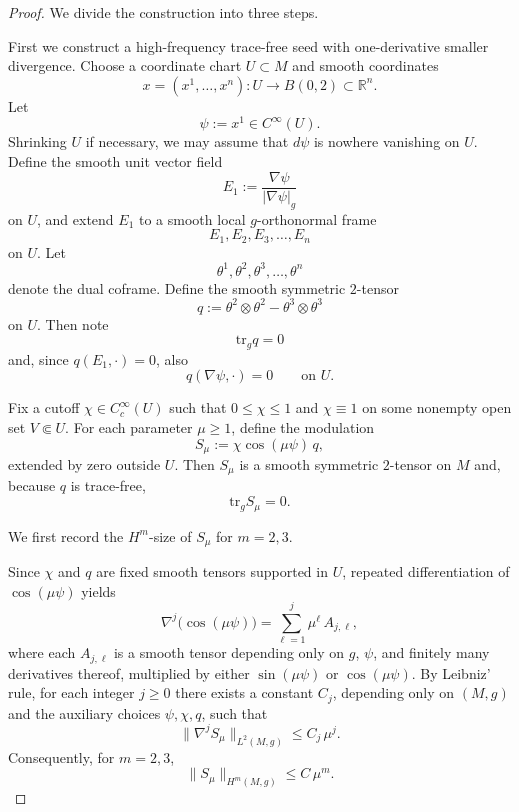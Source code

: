 \documentclass{amsart}
\newcommand{\tr}{\mbox{tr}}
\begin{document}
\begin{proof}
We divide the construction into three steps.

\medskip
\noindent  First we construct a high-frequency trace-free seed with one-derivative smaller divergence.
Choose a coordinate chart $U\subset M$ and smooth coordinates
\[
x=(x^{1},\dots,x^{n}):U\to B(0,2)\subset \mathbb R^{n}.
\]
Let
\[
\psi:=x^{1}\in C^{\infty}(U).
\]
Shrinking $U$ if necessary, we may assume that $d\psi$ is nowhere vanishing on $U$. Define the smooth unit vector field
\[
E_{1}:=\frac{\nabla \psi}{|\nabla \psi|_{g}}
\]
on $U$, and extend $E_{1}$ to a smooth local $g$-orthonormal frame
\[
E_{1},E_{2},E_{3},\dots,E_{n}
\]
on $U$. Let
\[
\theta^{1},\theta^{2},\theta^{3},\dots,\theta^{n}
\]
denote the dual coframe. Define the smooth symmetric $2$-tensor
\[
q:=\theta^{2}\otimes \theta^{2}-\theta^{3}\otimes \theta^{3}
\]
on $U$. Then note 
\[
\tr_{g} q = 0
\]
and, since $q(E_{1},\cdot)=0$, also
\[
q(\nabla \psi,\cdot)=0
\qquad\text{on }U.
\]

\noindent Fix a cutoff $\chi\in C_{c}^{\infty}(U)$ such that $0\leq \chi\leq 1$ and $\chi\equiv 1$ on some nonempty open set $V\Subset U$. For each parameter $\mu\geq 1$, define the modulation
\[
S_{\mu}:=\chi \cos(\mu\psi)\, q,
\]
extended by zero outside $U$. Then $S_{\mu}$ is a smooth symmetric $2$-tensor on $M$ and, because $q$ is trace-free,
\[
\tr_{g} S_{\mu}=0.
\]

\noindent We first record the $H^{m}$-size of $S_{\mu}$ for $m=2,3$.

\smallskip
\noindent Since $\chi$ and $q$ are fixed smooth tensors supported in $U$, repeated differentiation of $\cos(\mu\psi)$ yields
\[
\nabla^{j}\big(\cos(\mu\psi)\big)
=
\sum_{\ell=1}^{j} \mu^{\ell}\,A_{j,\ell},
\]
where each $A_{j,\ell}$ is a smooth tensor depending only on $g$, $\psi$, and finitely many derivatives thereof, multiplied by either $\sin(\mu\psi)$ or $\cos(\mu\psi)$. By Leibniz' rule, for each integer $j\geq 0$ there exists a constant $C_{j}$, depending only on $(M,g)$ and the auxiliary choices $\psi,\chi,q$, such that
\[
\|\nabla^{j} S_{\mu}\|_{L^{2}(M,g)}
\leq C_{j}\,\mu^{j}.
\]
Consequently, for $m=2,3$,
\begin{equation}
\label{eq:seed_upper}
\|S_{\mu}\|_{H^{m}(M,g)}\leq C\,\mu^{m}.
\end{equation}


\end{proof}
\end{document}
